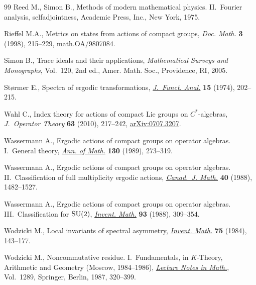 \documentclass[pdftex]{sigma}
\numberwithin{equation}{section}
\begin{document}
\begin{thebibliography}{99}
Reed M., Simon B., Methods of modern mathematical physics. {II}.~Fourier
 analysis, selfadjointness, Academic Press, Inc., New York, 1975.

Rief\/fel M.A., Metrics on states from actions of compact groups, \textit{Doc.
 Math.} \textbf{3} (1998), 215--229, \href{http://arxiv.org/abs/math.OA/9807084}{math.OA/9807084}.

Simon B., Trace ideals and their applications, \textit{Mathematical Surveys and
 Monographs}, Vol.~120, 2nd ed., Amer. Math. Soc., Providence, RI, 2005.

St{\o}rmer E., Spectra of ergodic transformations, \href{http://dx.doi.org/10.1016/0022-1236(74)90019-6}{\textit{J.~Funct. Anal.}}
 \textbf{15} (1974), 202--215.

Wahl C., Index theory for actions of compact {L}ie groups on {$C^*$}-algebras,
 \textit{J.~Operator Theory} \textbf{63} (2010), 217--242, \href{http://arxiv.org/abs/0707.3207}{arXiv:0707.3207}.

Wassermann A., Ergodic actions of compact groups on operator algebras.
 {I}.~{G}eneral theory, \href{http://dx.doi.org/10.2307/1971422}{\textit{Ann. of Math.}} \textbf{130} (1989), 273--319.

Wassermann A., Ergodic actions of compact groups on operator algebras.
 {II}.~{C}lassif\/ication of full multiplicity ergodic actions,
 \href{http://dx.doi.org/10.4153/CJM-1988-068-4}{\textit{Canad.~J. Math.}} \textbf{40} (1988), 1482--1527.

Wassermann A., Ergodic actions of compact groups on operator algebras.
 {III}.~{C}lassif\/ication for {${\rm SU}(2)$}, \href{http://dx.doi.org/10.1007/BF01394336}{\textit{Invent. Math.}}
 \textbf{93} (1988), 309--354.

Wodzicki M., Local invariants of spectral asymmetry, \href{http://dx.doi.org/10.1007/BF01403095}{\textit{Invent. Math.}}
 \textbf{75} (1984), 143--177.

Wodzicki M., Noncommutative residue. {I}.~{F}undamentals, in {$K$}-Theory,
 Arithmetic and Geometry ({M}oscow, 1984--1986), \href{http://dx.doi.org/10.1007/BFb0078372}{\textit{Lecture Notes in
 Math.}}, Vol.~1289, Springer, Berlin, 1987, 320--399.

\end{thebibliography}\LastPageEnding
\end{document}
